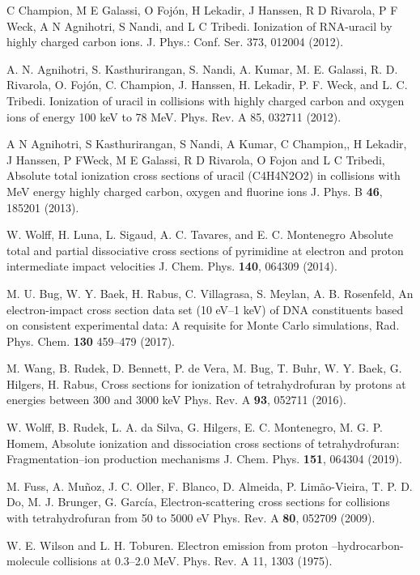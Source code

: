 \documentclass[preprint,12pt]{article}
\begin{document}
\begin{thebibliography}{99}
C Champion, M E Galassi, O Foj\'{o}n, H Lekadir, J Hanssen, R D Rivarola,
P F Weck, A N Agnihotri, S Nandi, and L C Tribedi. Ionization of RNA-uracil
by highly charged carbon ions.
J. Phys.: Conf. Ser. 373, 012004 (2012).

A. N. Agnihotri, S. Kasthurirangan, S. Nandi, A.
Kumar, M. E. Galassi, R. D. Rivarola, O. Foj\'{o}n, C. Champion, J. Hanssen,
H. Lekadir, P. F. Weck, and L. C. Tribedi. Ionization of uracil in
collisions with highly charged carbon and oxygen ions of energy 100 keV to
78 MeV. 
Phys. Rev. A 85, 032711 (2012).

A N Agnihotri, S Kasthurirangan, S Nandi, A Kumar, C Champion,, H Lekadir, 
J Hanssen, P FWeck, M E Galassi, R D Rivarola, O Fojon and L C Tribedi, 
Absolute total ionization cross sections of uracil (C4H4N2O2) in 
collisions with MeV energy highly charged carbon, oxygen and fluorine ions
J. Phys. B \textbf{46}, 185201 (2013).

W. Wolff, H. Luna, L. Sigaud, A. C. Tavares, and E. C. Montenegro
Absolute total and partial dissociative cross sections of pyrimidine
at electron and proton intermediate impact velocities
J. Chem. Phys. \textbf{140}, 064309 (2014).

M. U. Bug, W. Y. Baek, H. Rabus, C. Villagrasa, S. Meylan, A. B. Rosenfeld,
An electron-impact cross section data set (10 eV--1 keV) of DNA
constituents based on consistent experimental data: A requisite for 
Monte Carlo simulations,
Rad. Phys. Chem. \textbf{130} 459--479 (2017).

M. Wang, B. Rudek, D. Bennett, P. de Vera, M. Bug, T. Buhr, W. Y. Baek, 
G. Hilgers, H. Rabus, 
Cross sections for ionization of tetrahydrofuran by protons at energies 
between 300 and 3000 keV
Phys. Rev. A \textbf{93}, 052711 (2016).

W. Wolff, B. Rudek, L. A. da Silva, G. Hilgers, E. C. Montenegro, 
M. G. P. Homem,
Absolute ionization and dissociation cross sections of tetrahydrofuran:
Fragmentation--ion production mechanisms
J. Chem. Phys. \textbf{151}, 064304 (2019).

M. Fuss, A. Muñoz, J. C. Oller, F. Blanco, D. Almeida, P. Limão-Vieira, 
T. P. D. Do, M. J. Brunger, G. García,
Electron-scattering cross sections for collisions with tetrahydrofuran 
from 50 to 5000 eV
Phys. Rev. A \textbf{80}, 052709 (2009).


W. E. Wilson and L. H. Toburen. Electron emission from
proton --hydrocarbon-molecule collisions at 0.3--2.0 MeV. 
Phys. Rev. A 11, 1303 (1975).


\end{thebibliography}
\end{document}
